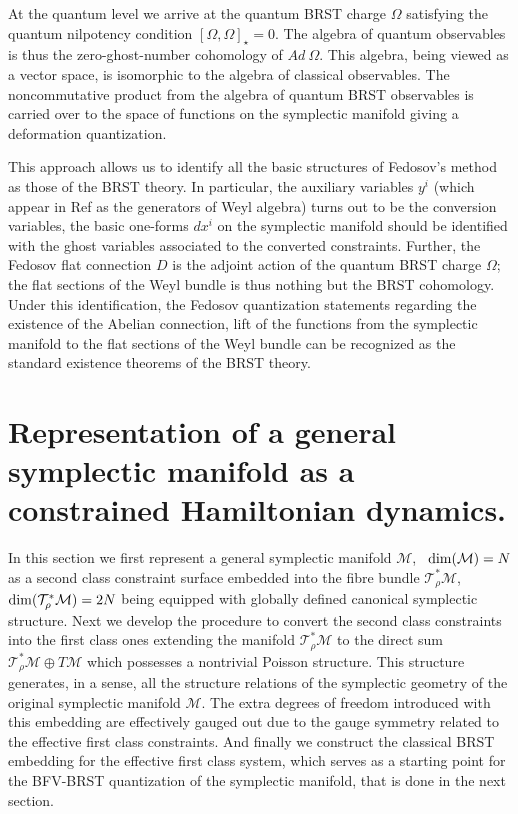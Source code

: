 \documentclass[a4paper,11pt,oneside]{amsart}
\theoremstyle{plain}
\numberwithin{equation}{section} %
\numberwithin{figure}{section} %
\newcommand{\qcommut}[2]{[#1,#2]_\star}
\renewcommand{\dim}[1]{{\rm dim}(#1)}
\def\mod{{\mathcal T}^*_\rho}
\def\manM{{\mathcal M}}
\begin{document}
\noindent
At the quantum level we arrive at the quantum BRST charge
$\Omega$ satisfying the quantum nilpotency condition
$\qcommut{\Omega}{\Omega}=0$.  The algebra of quantum
observables is thus the
zero-ghost-number cohomology of $Ad~\Omega$.  This algebra, being viewed
as a vector space, is isomorphic to the algebra
of classical observables. The noncommutative product
from the algebra of quantum BRST observables is carried over
to the space of functions on the symplectic manifold
giving a deformation quantization.


\noindent
This approach allows us to identify all the basic structures of
Fedosov's method as those of the BRST theory. In particular,
the auxiliary variables $y^i$ (which appear in Ref \cite{[Fedosov-JDG]}
as the generators of Weyl algebra) turns out to be the conversion
variables, the basic
one-forms $dx^i$ on the symplectic manifold should be identified with the
ghost variables associated to the converted constraints.  Further, the
Fedosov flat connection $D$ is the adjoint action of the quantum BRST charge
$\Omega$; the flat sections of the Weyl bundle is thus nothing but the BRST
cohomology.
Under this identification, the Fedosov quantization statements
regarding the existence of the Abelian connection, lift of
the functions from the symplectic manifold to the flat sections
of the Weyl bundle can be recognized as the standard existence
theorems of the BRST theory.



\section{ Representation of a general symplectic
manifold as a constrained Hamiltonian dynamics.}

In this section we first represent a general symplectic
manifold $\manM$, \, $\dim{\manM}=N$ as a second class
constraint surface embedded into the fibre bundle $\mod\manM$, \,
$\dim{\mod\manM}=2N$ being equipped with globally defined canonical
symplectic structure. Next we develop the procedure to convert the
second class constraints into the first class ones extending the
manifold $\mod\manM$ to the direct sum  $ \mod\manM \oplus T \manM$
which possesses a nontrivial Poisson structure.  This structure
generates, in a sense, all the structure relations of the
symplectic geometry of the original symplectic manifold $\manM$.  The
extra degrees of freedom introduced with this embedding are
effectively gauged out due to the gauge symmetry related to the
effective first class constraints.  And finally we construct the
classical BRST embedding for the effective first class system, which
serves as a starting point for the BFV-BRST quantization of the
symplectic manifold, that is done in the next section.
\end{document}
